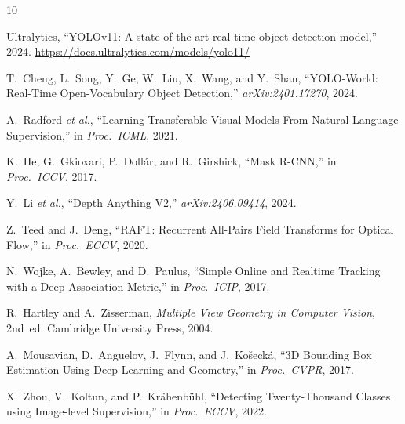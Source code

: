 \documentclass[conference]{IEEEtran}
\begin{document}
\begin{thebibliography}{10}

Ultralytics,
``YOLOv11: A state-of-the-art real-time object detection model,''
2024.
\url{https://docs.ultralytics.com/models/yolo11/}

T.~Cheng, L.~Song, Y.~Ge, W.~Liu, X.~Wang, and Y.~Shan,
``YOLO-World: Real-Time Open-Vocabulary Object Detection,''
\emph{arXiv:2401.17270}, 2024.

A.~Radford \emph{et al.},
``Learning Transferable Visual Models From Natural Language Supervision,''
in \emph{Proc.\ ICML}, 2021.

K.~He, G.~Gkioxari, P.~Doll{\'a}r, and R.~Girshick,
``Mask R-CNN,''
in \emph{Proc.\ ICCV}, 2017.

Y.~Li \emph{et al.},
``Depth Anything V2,''
\emph{arXiv:2406.09414}, 2024.

Z.~Teed and J.~Deng,
``RAFT: Recurrent All-Pairs Field Transforms for Optical Flow,''
in \emph{Proc.\ ECCV}, 2020.

N.~Wojke, A.~Bewley, and D.~Paulus,
``Simple Online and Realtime Tracking with a Deep Association Metric,''
in \emph{Proc.\ ICIP}, 2017.

R.~Hartley and A.~Zisserman,
\emph{Multiple View Geometry in Computer Vision}, 2nd~ed.
Cambridge University Press, 2004.

A.~Mousavian, D.~Anguelov, J.~Flynn, and J.~Ko{\v{s}}eck{\'a},
``3D Bounding Box Estimation Using Deep Learning and Geometry,''
in \emph{Proc.\ CVPR}, 2017.

X.~Zhou, V.~Koltun, and P.~Kr{\"a}henb{\"u}hl,
``Detecting Twenty-Thousand Classes using Image-level Supervision,''
in \emph{Proc.\ ECCV}, 2022.

\end{thebibliography}
\end{document}
